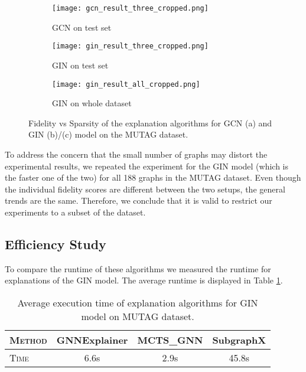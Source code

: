 \begin{figure}[htb]
  \begin{subfigure}{0.32\textwidth}
    \texttt{[image: gcn\_result\_three\_cropped.png]}
    \caption{GCN on test set}
  \end{subfigure}
  \hspace*{\fill}
  \begin{subfigure}{0.32\textwidth}
    \texttt{[image: gin\_result\_three\_cropped.png]}
    \caption{GIN on test set}
  \end{subfigure}
  \hspace*{\fill}
  \begin{subfigure}{0.32\textwidth}
    \texttt{[image: gin\_result\_all\_cropped.png]}
    \caption{GIN on whole dataset}
  \end{subfigure}
\caption{Fidelity vs Sparsity of the explanation algorithms for GCN (a) and GIN (b)/(c) model on the MUTAG dataset.}
\label{fig:mutag_result}
\end{figure}

To address the concern that the small number of graphs may distort the experimental results, we repeated the experiment for the GIN model (which is the faster one of the two) for all 188 graphs in the MUTAG dataset. 
Even though the individual fidelity scores are different between the two setups, the general trends are the same. 
Therefore, we conclude that it is valid to restrict our experiments to a subset of the dataset.


\subsection{Efficiency Study}
To compare the runtime of these algorithms we measured the runtime for explanations of the GIN model. The average runtime is displayed in Table \ref{tab:execution_time}.

\begin{table}[htb]
    \centering
    \begin{tabular}{lccc}
    \textsc{Method} & GNNExplainer & MCTS\_GNN\footnotemark & SubgraphX \\ \hline
    \textsc{Time}   & 6.6s & 2.9s & 45.8s
    \end{tabular}
    \caption{Average execution time of explanation algorithms for GIN model on MUTAG dataset.}
    \label{tab:execution_time}
\end{table}


